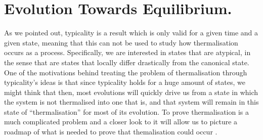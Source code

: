 \section{Evolution Towards Equilibrium.}
As we pointed out, typicality is a result which is only valid for a given time and a given state, meaning that this can not be used to study how thermalisation occurs as a process. Specifically, we are interested in states that are atypical, in the sense that are states that locally differ drastically from the canonical state. One of the motivations behind treating the problem of thermalisation through typicality's ideas is that since typicality holds for a huge amount of states, we might think that then, most evolutions will quickly drive us from a state in which the system is not thermalised into one that is, and that system will remain in this state of ``thermalisation'' for most of its evolution. To prove thermalisation is a much complicated problem and a closer look to it will allow us to picture a roadmap of what is needed to prove that themalisation could occur \cite{linden_quantum_2009}.


